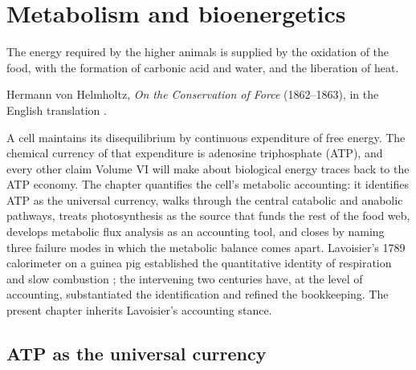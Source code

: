\chapter{Metabolism and bioenergetics}
\label{vol06:ch02}

\epigraph{The energy required by the higher animals is supplied by the
oxidation of the food, with the formation of carbonic acid and water,
and the liberation of heat.}{Hermann von Helmholtz, \emph{On the
Conservation of Force} (1862--1863), in the English translation
\cite[p.~210]{hist:helmholtz1863}.}


\noindent
A cell maintains its disequilibrium by continuous expenditure of free
energy. The chemical currency of that expenditure is adenosine
triphosphate (ATP), and every other claim Volume VI will make about
biological energy traces back to the ATP economy. The chapter
quantifies the cell's metabolic accounting: it identifies ATP as the
universal currency, walks through the central catabolic and anabolic
pathways, treats photosynthesis as the source that funds the rest of
the food web, develops metabolic flux analysis as an accounting tool,
and closes by naming three failure modes in which the metabolic
balance comes apart. Lavoisier's 1789 calorimeter on a guinea pig
established the quantitative identity of respiration and slow
combustion \cite{hist:v6c02-lavoisier-respiration-1789}; the
intervening two centuries have, at the level of accounting,
substantiated the identification and refined the bookkeeping. The
present chapter inherits Lavoisier's accounting stance.

\section{ATP as the universal currency}

